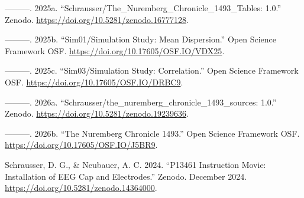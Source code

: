 \documentclass[
]{article}
\newlength{\cslhangindent}
\newlength{\cslentryspacingunit} %
\newenvironment{CSLReferences}[2] %
 {%
  \setlength{\parindent}{0pt}
  \ifodd #1
  \let\oldpar\par
  \def\par{\hangindent=\cslhangindent\oldpar}
  \fi
  \setlength{\parskip}{#2\cslentryspacingunit}
 }%
 {}
\begin{document}
\begin{CSLReferences}{1}{0}
\leavevmode{}%
---------. 2025a.
{``{Schrausser/The\_Nuremberg\_Chronicle\_1493\_Tables: 1.0}.''} Zenodo.
\url{https://doi.org/10.5281/zenodo.16777128}.

\leavevmode{}%
---------. 2025b. {``Sim01/Simulation Study: Mean Dispersion.''} Open
Science Framework OSF. \url{https://doi.org/10.17605/OSF.IO/VDX25}.

\leavevmode{}%
---------. 2025c. {``Sim03/Simulation Study: Correlation.''} Open
Science Framework OSF. \url{https://doi.org/10.17605/OSF.IO/DRBC9}.

\leavevmode{}%
---------. 2026a.
{``Schrausser/the\_nuremberg\_chronicle\_1493\_sources: 1.0.''} Zenodo.
\url{https://doi.org/10.5281/zenodo.19239636}.

\leavevmode{}%
---------. 2026b. {``The Nuremberg Chronicle 1493.''} Open Science
Framework OSF. \url{https://doi.org/10.17605/OSF.IO/J5BR9}.

\leavevmode{}%
Schrausser, D. G., \& Neubauer, A. C. 2024. {``P13461 Instruction Movie:
Installation of EEG Cap and Electrodes.''} Zenodo. December 2024.
\url{https://doi.org/10.5281/zenodo.14364000}.

\end{CSLReferences}
\end{document}
